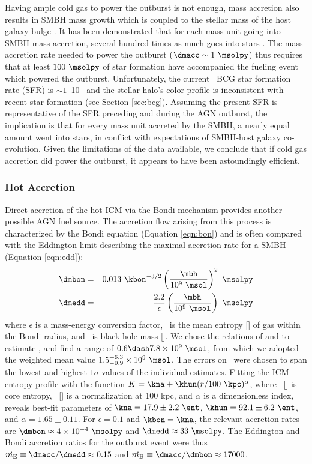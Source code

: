 \documentclass[11pt, preprint]{aastex}
\begin{document}
Having ample cold gas to power the outburst is not enough, mass
accretion also results in SMBH mass growth which is coupled to the
stellar mass of the host galaxy bulge \citep{1995ARA&A..33..581K}. It
has been demonstrated that for each mass unit going into SMBH mass
accretion, several hundred times as much goes into stars
\citep{magorrian}. The mass accretion rate needed to power the
outburst ($\dmacc \sim 1 ~\msolpy$) thus requires that at least $100
~\msolpy$ of star formation have accompanied the fueling event which
powered the outburst. Unfortunately, the current \rbs\ BCG star
formation rate (SFR) is $\sim 1$--10 \msolpy\ and the stellar halo's
color profile is inconsistent with recent star formation (see Section
\ref{sec:bcg}). Assuming the present SFR is representative of the SFR
preceding and during the AGN outburst, the implication is that for
every mass unit accreted by the SMBH, a nearly equal amount went into
stars, in conflict with expectations of SMBH-host galaxy
co-evolution. Given the limitations of the data available, we conclude
that if cold gas accretion did power the outburst, it appears to have
been astoundingly efficient.

\subsubsection{Hot Accretion}

Direct accretion of the hot ICM via the Bondi mechanism provides
another possible AGN fuel source. The accretion flow arising from this
process is characterized by the Bondi equation (Equation
\ref{eqn:bon}) and is often compared with the Eddington limit
describing the maximal accretion rate for a SMBH (Equation
\ref{eqn:edd}):
\begin{eqnarray}
  \dmbon &=& 0.013 ~\kbon^{-3/2} \left(\frac{\mbh}{10^9
    ~\msol}\right)^{2} ~\msolpy \label{eqn:bon}\\
  \dmedd &=& \frac{2.2}{\epsilon} \left(\frac{\mbh}{10^9~\msol}\right)
  ~\msolpy  \label{eqn:edd}
\end{eqnarray}
where $\epsilon$ is a mass-energy conversion factor, \kbon\ is the
mean entropy [\ent] of gas within the Bondi radius, and \mbh\ is black
hole mass [\msol]. We chose the relations of
\citet{2002ApJ...574..740T} and \citet{2007MNRAS.379..711G} to
estimate \mbh, and find a range of $0.6 \dash 7.8 \times 10^9 ~\msol$,
from which we adopted the weighted mean value $1.5^{+6.3}_{-0.9}
\times 10^9 ~\msol$. The errors on \mbh\ were chosen to span the
lowest and highest $1\sigma$ values of the individual
estimates. Fitting the ICM entropy profile with the function $K = \kna
+\khun (r/100 ~\kpc)^{\alpha}$, where \kna\ [\ent] is core entropy,
\khun\ [\ent] is a normalization at 100 kpc, and $\alpha$ is a
dimensionless index, reveals best-fit parameters of $\kna = 17.9 \pm
2.2 ~\ent$, $\khun = 92.1 \pm 6.2 ~\ent$, and $\alpha = 1.65 \pm
0.11$. For $\epsilon = 0.1$ and $\kbon = \kna$, the relevant accretion
rates are $\dmbon \approx 4 \times 10^{-4} ~\msolpy$ and $\dmedd
\approx 33 ~\msolpy$. The Eddington and Bondi accretion ratios for the
outburst event were thus $\dme \equiv \dmacc/\dmedd \approx 0.15$ and
$\dmb \equiv \dmacc/\dmbon \approx 17000$.
\end{document}
